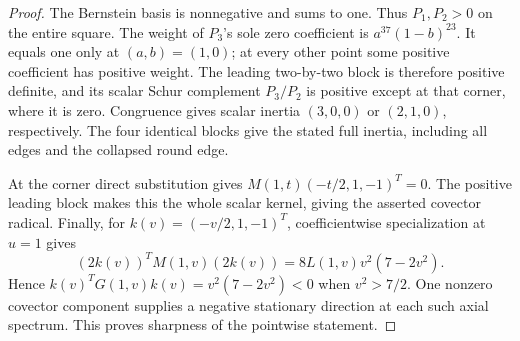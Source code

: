 \documentclass[11pt]{article}
\numberwithin{equation}{section}
\theoremstyle{definition}
\theoremstyle{remark}
\begin{document}
\begin{proof}
The Bernstein basis is nonnegative and sums to one.
Thus \(P_1,P_2>0\) on the entire square. The weight of
\(P_3\)'s sole zero coefficient is \(a^{37}(1-b)^{23}\).
It equals one only at \((a,b)=(1,0)\); at every other point
some positive coefficient has positive weight. The leading
two-by-two block is therefore positive definite, and its
scalar Schur complement \(P_3/P_2\) is positive except at
that corner, where it is zero. Congruence gives scalar
inertia \((3,0,0)\) or \((2,1,0)\), respectively. The four
identical blocks give the stated full inertia, including
all edges and the collapsed round edge.

At the corner direct substitution gives
\(M(1,t)(-t/2,1,-1)^T=0\). The positive leading block
makes this the whole scalar kernel, giving the asserted
covector radical. Finally, for \(k(v)=(-v/2,1,-1)^T\),
coefficientwise specialization at \(u=1\) gives
\[
 (2k(v))^TM(1,v)(2k(v))=8L(1,v)v^2(7-2v^2).
\]
Hence \(k(v)^TG(1,v)k(v)=v^2(7-2v^2)<0\) when
\(v^2>7/2\). One nonzero covector component supplies a
negative stationary direction at each such axial spectrum.
This proves sharpness of the pointwise statement.
\end{proof}
\end{document}
